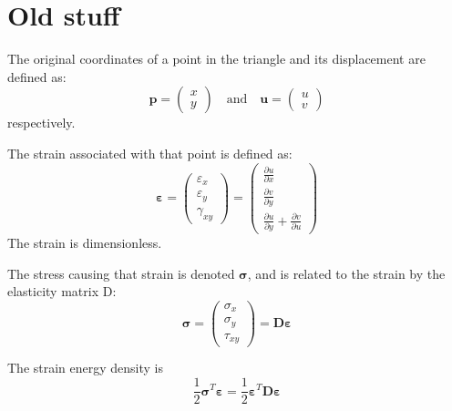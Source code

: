 \documentclass{article}
\renewcommand{\vec}[1]{\mathbf{#1}}
\renewcommand{\epsilon}{\varepsilon}
\begin{document}
\section{Old stuff}
\label{fem2:sec:old-stuff}

The original coordinates of a point in the triangle and its
displacement are defined as:
\begin{displaymath}
  \vec{p}= \begin{pmatrix}
    x \\
    y
  \end{pmatrix}
\quad\mbox{and}\quad
\vec{u}= \begin{pmatrix} 
  u \\
  v
\end{pmatrix}
\end{displaymath}
respectively.

The strain associated with that point is defined as:
\begin{displaymath}
  \vec{\epsilon} =
  \begin{pmatrix}
    \epsilon_x \\ \epsilon_y \\ \gamma_{xy}
  \end{pmatrix}
  = 
  \begin{pmatrix}
    \frac{\partial u}{\partial x} \\
    \frac{\partial v}{\partial y} \\
    \frac{\partial u}{\partial y} +
    \frac{\partial v}{\partial u} 
  \end{pmatrix}
\end{displaymath}
The strain is dimensionless.

The stress causing that strain is denoted $\vec{\sigma}$, and is
related to the strain by the elasticity matrix D:
\begin{displaymath}
  \vec{\sigma} =
  \begin{pmatrix}
    \sigma_x \\ \sigma_y \\ \tau_{xy}
  \end{pmatrix}
  = 
  \vec{D}\vec{\epsilon}
\end{displaymath}

The strain energy density is
\begin{displaymath}
  \frac{1}{2}\vec{\sigma}^T\vec{\epsilon} = 
  \frac{1}{2}\vec{\epsilon}^T\vec{D}\vec{\epsilon}
\end{displaymath}
\end{document}
